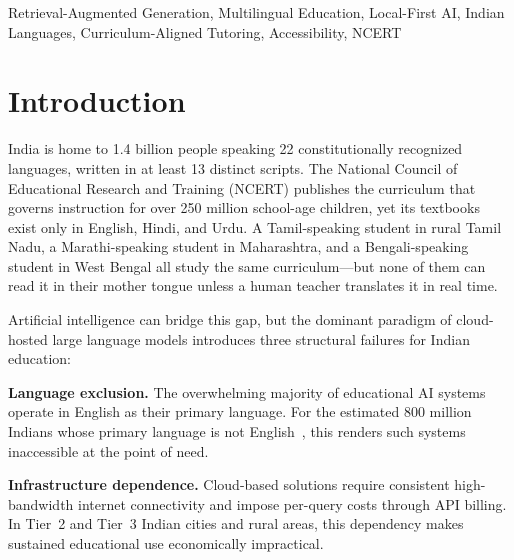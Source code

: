 \documentclass[conference]{IEEEtran}
\begin{document}
\begin{abstract}
repairs twelve vulnerabilities, including a safety pipeline that silently failed open and a JWT implementation that accepted refresh tokens as access credentials. Reading support for dyslexic learners introduces akshara-level segmentation for nine Brahmic scripts, replacing the Latin-alphabet assumptions of conventional readability tooling. The system is validated by 445 automated tests with zero failures across unit, integration, and end-to-end suites.
\end{abstract}

\begin{IEEEkeywords}
Retrieval-Augmented Generation, Multilingual Education, Local-First AI, Indian Languages, Curriculum-Aligned Tutoring, Accessibility, NCERT
\end{IEEEkeywords}

\section{Introduction}

India is home to 1.4 billion people speaking 22 constitutionally recognized languages, written in at least 13 distinct scripts. The National Council of Educational Research and Training (NCERT) publishes the curriculum that governs instruction for over 250 million school-age children, yet its textbooks exist only in English, Hindi, and Urdu. A Tamil-speaking student in rural Tamil Nadu, a Marathi-speaking student in Maharashtra, and a Bengali-speaking student in West Bengal all study the same curriculum---but none of them can read it in their mother tongue unless a human teacher translates it in real time.

Artificial intelligence can bridge this gap, but the dominant paradigm of cloud-hosted large language models introduces three structural failures for Indian education:

\textbf{Language exclusion.} The overwhelming majority of educational AI systems operate in English as their primary language. For the estimated 800 million Indians whose primary language is not English~\cite{b1}, this renders such systems inaccessible at the point of need.

\textbf{Infrastructure dependence.} Cloud-based solutions require consistent high-bandwidth internet connectivity and impose per-query costs through API billing. In Tier~2 and Tier~3 Indian cities and rural areas, this dependency makes sustained educational use economically impractical.
\end{document}
